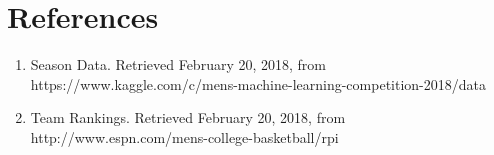 \section{References}
\begin{enumerate}
	\item Season Data. Retrieved February 20, 2018, from https://www.kaggle.com/c/mens-machine-learning-competition-2018/data
	\item Team Rankings. Retrieved February 20, 2018, from http://www.espn.com/mens-college-basketball/rpi
\end{enumerate}
